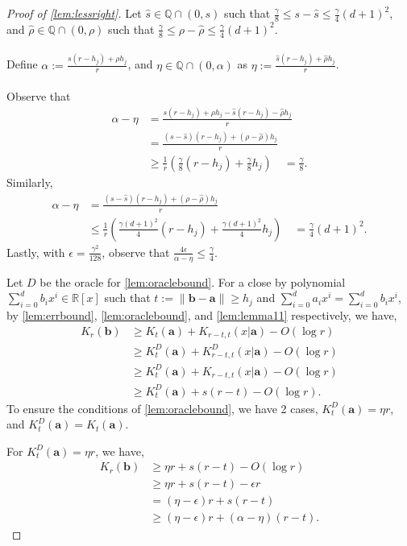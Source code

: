 \documentclass[a4paper,UKenglish,cleveref,autoref,thm-restate]{lipics-v2021}
\begin{document}
\begin{proof}[Proof of \cref{lem:lessright}]
	Let $\hat{s}\in\mathbb{Q}\cap(0,s)$ such that $\frac{\gamma}{8}\leq s-\hat{s}\leq\frac{\gamma}{4}(d+1)^2$, and $\hat{\rho}\in\mathbb{Q}\cap(0,\rho)$ such that $\frac{\gamma}{8}\leq \rho-\hat{\rho}\leq\frac{\gamma}{4}(d+1)^2$.\\
	\\
	Define $\alpha:=\frac{s(r-h_j)+\rho h_j}{r}$, and $\eta\in\mathbb{Q}\cap(0,\alpha)$ as $\eta:=\frac{\hat{s}(r-h_j)+\hat{\rho}h_j}{r}$.\\
	\\
	Observe that 
	\begin{align*}
		\alpha-\eta&=\frac{s(r-h_j)+\rho h_j-\hat{s}(r-h_j)-\hat{\rho}h_j}{r}\\
		&=\frac{(s-\hat{s})(r-h_j)+(\rho-\hat{\rho})h_j}{r}\\
		&\geq\frac{1}{r}\left(\frac{\gamma}{8}(r-h_j)+\frac{\gamma}{8}h_j\right)\quad=\frac{\gamma}{8}.
	\end{align*}
	Similarly,
	\begin{align*}
		\alpha-\eta
		&=\frac{(s-\hat{s})(r-h_j)+(\rho-\hat{\rho})h_j}{r}\\
		&\leq\frac{1}{r}\left(\frac{\gamma(d+1)^2}{4}\left(r-h_j\right)+\frac{\gamma(d+1)^2}{4}h_j\right)
		\quad=\frac{\gamma}{4}(d+1)^2.
	\end{align*}
	Lastly, with $\epsilon=\frac{\gamma^2}{128}$, observe that $\frac{4\epsilon}{\alpha-\eta}\leq\frac{\gamma}{4}$. 
	
	Let $D$ be the oracle for \cref{lem:oraclebound}. For a close by polynomial $\sum_{i=0}^db_ix^i\in\mathbb{R}[x]$ such that $t:=\|\mathbf{b}-\mathbf{a}\|\geq h_j$ and $\sum_{i=0}^{d}a_ix^i=\sum_{i=0}^{d}b_ix^i$, by \cref{lem:errbound}, \cref{lem:oraclebound}, and \cref{lem:lemma11} respectively, we have, 
	\begin{align*}
          K_r(\mathbf{b})
          &\geq K_t(\mathbf{a})+K_{r-t,t}(x|\mathbf{a})-O(\log r)\\
          &\geq K_t^D(\mathbf{a})+K_{r-t,t}^D(x|\mathbf{a})-O(\log r)\\
		&\geq K_t^D(\mathbf{a})+K_{r-t,t}(x|\mathbf{a})-O(\log r)\\
		&\geq K_t^D(\mathbf{a})+s(r-t)-O(\log r).
	\end{align*}
	To ensure the conditions of \cref{lem:oraclebound}, we have 2 cases, $K_t^D(\mathbf{a})=\eta r$, and $K_t^D(\mathbf{a})=K_t(\mathbf{a})$. 
	
	For $K_t^D(\mathbf{a})=\eta r$, we have, 
	\begin{align*}
		K_r(\mathbf{b})&\geq\eta r+s(r-t)-O(\log r)\\
		&\geq\eta r+s(r-t)-\epsilon r\\
		&=(\eta-\epsilon)r+s(r-t)\\
		&\geq(\eta-\epsilon)r+(\alpha-\eta)(r-t).
	\end{align*}
	

\end{proof}
\end{document}
